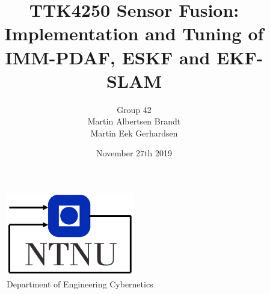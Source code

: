 \documentclass[11pt, a4paper, USenglish]{article}
\begin{document}
\title{TTK4250 Sensor Fusion:\\
Implementation and Tuning of\\
IMM-PDAF, ESKF and EKF-SLAM}
\author{Group 42 \\ Martin Albertsen Brandt \\ Martin Eek Gerhardsen}
\date{November 27th 2019}
\begin{titlepage}
    \maketitle
    \begin{figure}
    \centering
    \includegraphics[width=0.5\textwidth]{figures/itk_ntnu}\\
    Department of Engineering Cybernetics
    \end{figure}
    \thispagestyle{empty}
\end{titlepage}

\newpage

\thispagestyle{empty} %

\newpage
\tableofcontents
\thispagestyle{empty} %

\newpage
\setcounter{page}{1}





% 



\newpage
{}
\printbibliography{}
\printglossary[type=\acronymtype]
\label{sec:bibliography}
\end{document}
